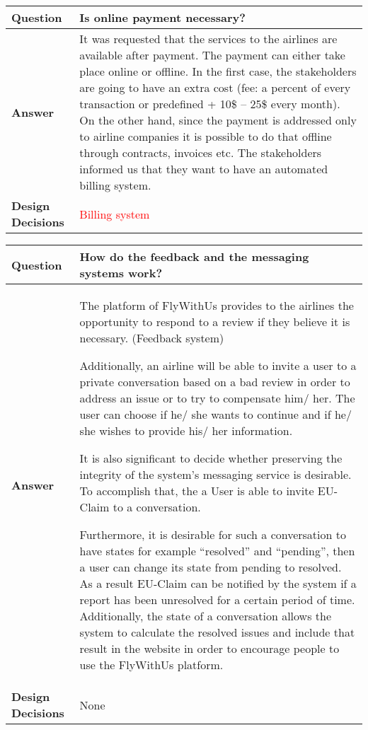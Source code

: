 \begin{longtable}{| l |  p{12cm} |}
\hline
\textbf{Question} & \textbf{Is online payment necessary?} \\ \hline
\textbf{Answer} &
	 It was requested that the services to the airlines are available after payment. The payment can either take place online or offline. In the first case, 
	the stakeholders are going to have an extra cost (fee: a percent of every transaction or predefined + 10\$ – 25\$ every month). On the other hand, since the 
	payment is addressed only to airline companies it is possible to do that offline through contracts, invoices etc.
	The stakeholders informed us that they want to have an automated billing system. \\ \hline
\textbf{Design Decisions} & \textcolor{red}{Billing system} \\ \hline
\end{longtable}

\begin{longtable}{| l |  p{12cm} |}
\hline
\textbf{Question} & \textbf{How do the feedback and the messaging systems work?} \\ \hline
\textbf{Answer} &
	The platform of FlyWithUs provides to the airlines the opportunity to respond to a review if they believe it is necessary. (Feedback system)\newline

	Additionally, an airline will be able to invite a user to a private conversation based on a bad review in order to address an issue or to try to compensate him/ her. The user can choose 
	if he/ she wants to continue and if he/ she wishes to provide his/ her information. \newline

	It is also significant to decide whether preserving the integrity of the system's messaging service is desirable. To accomplish that, the a User is able to invite EU-Claim to a conversation. \newline

	Furthermore, it is desirable for such a conversation to have states for example “resolved” and “pending”, then a user can change its state from pending to resolved. As a result 
	EU-Claim can be notified by the system if a report has been unresolved for a certain period of time. Additionally, the state of a conversation allows the system to calculate the resolved 
	issues and include that result in the website in order to encourage people to use the FlyWithUs platform. \\ \hline
\textbf{Design Decisions} & None \\ \hline
\end{longtable}

